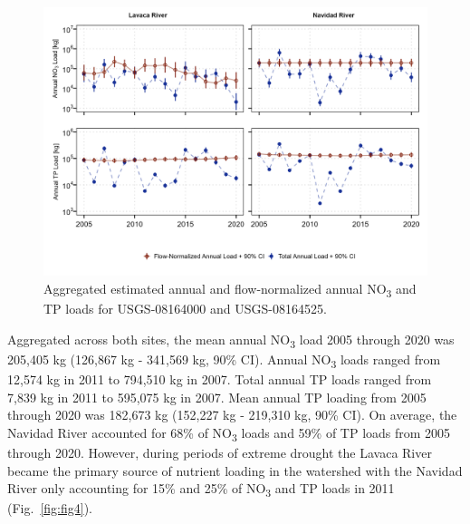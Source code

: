 \documentclass[fleqn,10pt,lineno]{wlpeerj} %
\begin{document}
\begin{figure}

{\centering \includegraphics[width=1\linewidth,]{Schramm-2023-06-PeerJ_files/figure-latex/fig3-1} 

}

\caption{Aggregated estimated annual and flow-normalized annual NO\textsubscript{3} and TP loads for USGS-08164000 and USGS-08164525.}\label{fig:fig3}
\end{figure}

Aggregated across both sites, the mean annual NO\textsubscript{3} load
2005 through 2020 was 205,405 kg (126,867 kg - 341,569 kg, 90\% CI).
Annual NO\textsubscript{3} loads ranged from 12,574 kg in 2011 to
794,510 kg in 2007. Total annual TP loads ranged from 7,839 kg in 2011
to 595,075 kg in 2007. Mean annual TP loading from 2005 through 2020 was
182,673 kg (152,227 kg - 219,310 kg, 90\% CI). On average, the Navidad
River accounted for 68\% of NO\textsubscript{3} loads and 59\% of TP
loads from 2005 through 2020. However, during periods of extreme drought
the Lavaca River became the primary source of nutrient loading in the
watershed with the Navidad River only accounting for 15\% and 25\% of
NO\textsubscript{3} and TP loads in 2011 (Fig.~\ref{fig:fig4}).
\end{document}
